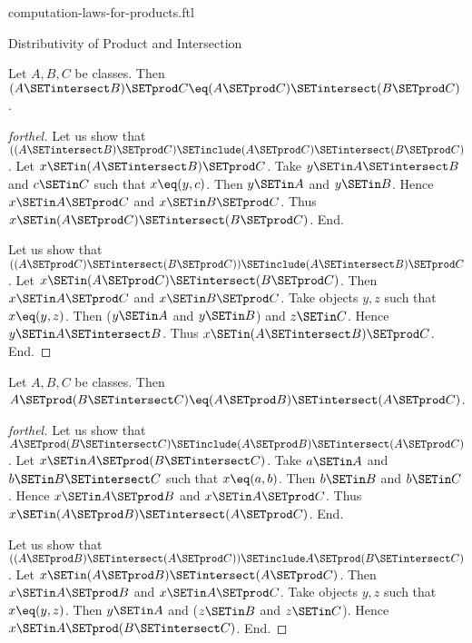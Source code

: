 \documentclass{stex}
\begin{document}
\begin{smodule}{computation-laws-for-products.ftl}
\begin{sfragment}{Distributivity of Product and Intersection}
  \begin{proposition}[forthel,id=FOUNDATIONS_05_1249567930580992]
    Let $A, B, C$ be classes.
    Then $(A \SETintersect B) \SETprod C \eq (A \SETprod C) \SETintersect (B \SETprod C)$.
  \end{proposition}
  \begin{proof}[forthel]
    Let us show that $((A \SETintersect B) \SETprod C) \SETinclude (A \SETprod C) \SETintersect (B \SETprod C)$. %
      Let $x \SETin (A \SETintersect B) \SETprod C$.
      Take $y \SETin A \SETintersect B$ and $c \SETin C$ such that $x \eq (y, c)$.
      Then $y \SETin A$ and $y \SETin B$.
      Hence $x \SETin A \SETprod C$ and $x \SETin B \SETprod C$.
      Thus $x \SETin (A \SETprod C) \SETintersect (B \SETprod C)$.
    End.

    Let us show that $((A \SETprod C) \SETintersect (B \SETprod C)) \SETinclude (A \SETintersect B) \SETprod C$. %
      Let $x \SETin (A \SETprod C) \SETintersect (B \SETprod C)$.
      Then $x \SETin A \SETprod C$ and $x \SETin B \SETprod C$.
      Take objects $y, z$ such that $x \eq (y, z)$.
      Then ($y \SETin A$ and $y \SETin B$) and $z \SETin C$.
      Hence $y \SETin A \SETintersect B$.
      Thus $x \SETin (A \SETintersect B) \SETprod C$.
    End.
  \end{proof}

  \begin{proposition}[forthel,id=FOUNDATIONS_05_954964241285120]
    Let $A, B, C$ be classes.
    Then $A \SETprod (B \SETintersect C) \eq (A \SETprod B) \SETintersect (A \SETprod C)$.
  \end{proposition}
  \begin{proof}[forthel]
    Let us show that $A \SETprod (B \SETintersect C) \SETinclude (A \SETprod B) \SETintersect (A \SETprod C)$.
      Let $x \SETin A \SETprod (B \SETintersect C)$.
      Take $a \SETin A$ and $b \SETin B \SETintersect C$ such that $x \eq (a, b)$.
      Then $b \SETin B$ and $b \SETin C$.
      Hence $x \SETin A \SETprod B$ and $x \SETin A \SETprod C$.
      Thus $x \SETin (A \SETprod B) \SETintersect (A \SETprod C)$.
    End.

    Let us show that $((A \SETprod B) \SETintersect (A \SETprod C)) \SETinclude A \SETprod (B \SETintersect C)$. %
      Let $x \SETin (A \SETprod B) \SETintersect (A \SETprod C)$.
      Then $x \SETin A \SETprod B$ and $x \SETin A \SETprod C$.
      Take objects $y, z$ such that $x \eq (y, z)$.
      Then $y \SETin A$ and ($z \SETin B$ and $z \SETin C$).
      Hence $x \SETin A \SETprod (B \SETintersect C)$.
    End.
  \end{proof}
\end{sfragment}


\end{smodule}
\end{document}
